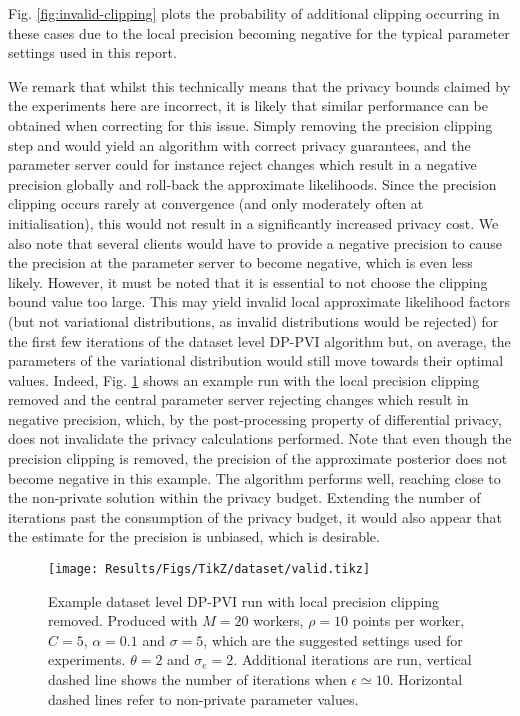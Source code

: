 Fig. \ref{fig:invalid-clipping} plots the probability of additional clipping occurring in these cases due to the local precision becoming negative for the typical parameter settings used in this report.

We remark that whilst this technically means that the privacy bounds claimed by the experiments here are incorrect, it is likely that similar performance can be obtained when correcting for this issue. Simply removing the precision clipping step and would yield an algorithm with correct privacy guarantees, and the parameter server could for instance reject changes which result in a negative precision globally and roll-back the approximate likelihoods. Since the precision clipping occurs rarely at convergence (and only moderately often at initialisation), this would not result in a significantly increased privacy cost. We also note that several clients would have to provide a negative precision to cause the precision at the parameter server to become negative, which is even less likely. However, it must be noted that it is essential to not choose the clipping bound value too large.  This may yield invalid local approximate likelihood factors (but not variational distributions, as invalid distributions would be rejected) for the first few iterations of the dataset level DP-PVI algorithm but, on average, the parameters of the variational distribution would still move towards their optimal values. Indeed, Fig. \ref{fig:valid} shows an example run with the local precision clipping removed and the central parameter server rejecting changes which result in negative precision, which, by the post-processing property of differential privacy, does not invalidate the privacy calculations performed. Note that even though the precision clipping is removed, the precision of the approximate posterior does not become negative in this example. The algorithm performs well, reaching close to the non-private solution within the privacy budget. Extending the number of iterations past the consumption of the privacy budget, it would also appear that the estimate for the precision is unbiased, which is desirable. 

\begin{figure}
	\texttt{[image: Results/Figs/TikZ/dataset/valid.tikz]}
	\centering
	\caption{\label{fig:valid} Example dataset level DP-PVI run with local precision clipping removed. Produced with $M=20$ workers, $\rho = 10$ points per worker, $C=5$, $\alpha=0.1$ and $\sigma = 5$, which are the suggested settings used for experiments. $\theta=2$ and $\sigma_e = 2$. Additional iterations are run, vertical dashed line shows the number of iterations when $\epsilon \simeq 10$. Horizontal dashed lines refer to non-private parameter values. }
\end{figure}

